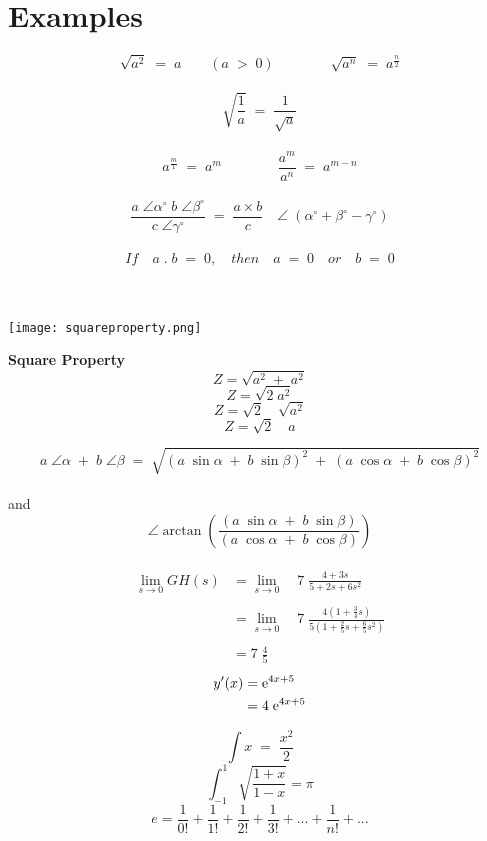 \section{Examples}

\[\sqrt{a^2} \; = \; a \qquad (a \; > \; 0) \qquad \qquad \sqrt{a^n} \; = \; a^{\frac{n}{2}}\] \\
\[\sqrt{\frac{1}{a}} \; = \; \frac{1}{\sqrt{a}}\] \\
\[a^{\frac{m}{1}} \; = \; a^m \qquad \qquad \frac{a^m}{a^n} \; = \; a^{m-n}\] \\
\[\frac{a \; \angle \alpha^\circ \; b \; \angle \beta^\circ}{c \; \angle \gamma^\circ} \; = \; \frac{a \times b}{c} \quad \angle \; (\alpha^\circ + \beta^\circ - \gamma^\circ)\]
\\
\[If \quad a \; . \; b \; = \; 0, \quad then \quad a \; = \; 0 \quad or \quad b \; = \; 0\]
\\
\\
\begin{minipage}{0.60\linewidth}
	\texttt{[image: squareproperty.png]}
\end{minipage}
\begin{minipage}[H]{0.3\linewidth}
	\textbf{Square Property} \\
	\[Z=\sqrt{a^2 \; + \; a^2}\]
	\[Z=\sqrt{2 \; a^2}\]
	\[Z=\sqrt{2} \quad \sqrt{a^2}\]
	\[Z=\sqrt{2} \quad a\]
\end{minipage}
\vspace{1cm}
\[a \; \angle \alpha \; + \; b \; \angle \beta \; = \; \sqrt{(a \;  \sin \alpha \; + \; b \; \sin \beta)^2 \; + \; (a \; \cos \alpha \; + \; b \; \cos \beta)^2}\] \\
and \\
\[\angle \arctan(\frac{(a \; \sin \alpha \; + \; b \; \sin \beta)}{(a \; \cos \alpha \; + \; b \; \cos \beta)})\] \\
\begin{align*}
	\lim_{s \to 0}{GH(s)} & = \lim_{s \to 0} \quad 7 \; \frac{4+3s}{5+2s+6s^2} \\ \\
	& = \lim_{s \to 0} \quad 7 \; \frac{4(1+\frac{3}{4}s)}{5(1+\frac{2}{5}s+\frac{6}{5}s^2)} \\ \\
	& = 7 \; \frac{4}{5}
\end{align*}
\begin{align*}
	y'(x) &= \mathrm{e}^{4x+5} \\
	&= 4 \; \mathrm{e}^{4x+5}
\end{align*}

\newpage

\newpage
\[\int x \; = \; \frac{x^2}{2}\]
\[\int_{-1}^{1}\sqrt{\frac{1+x}{1-x}}=\pi\]
\[e=\frac{1}{0!}+\frac{1}{1!}+\frac{1}{2!}+\frac{1}{3!}+...+\frac{1}{n!}+...\]
\newpage
